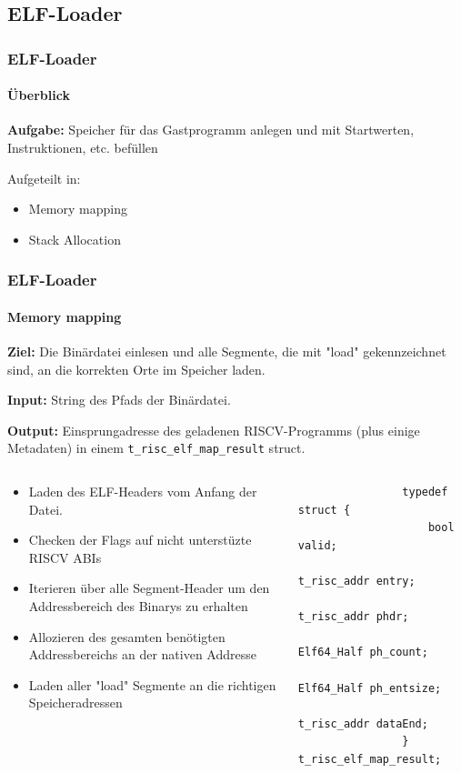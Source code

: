 \documentclass[german]{tum-presentation}
\begin{document}
\subsection{ELF-Loader} %
\begin{frame}
	\frametitle{ELF-Loader}
	\framesubtitle{Überblick}
	\textbf{Aufgabe:} Speicher für das Gastprogramm anlegen und mit Startwerten, Instruktionen, etc. befüllen

	\vspace{0.25cm}
	Aufgeteilt in:
	\begin{itemize}
		\item Memory mapping
		\item Stack Allocation
	\end{itemize}
\end{frame}


\begin{frame}[fragile]
	\frametitle{ELF-Loader}
	\framesubtitle{Memory mapping}
	\textbf{Ziel:} Die Binärdatei einlesen und alle Segmente, die mit "load" gekennzeichnet sind, an die korrekten Orte im Speicher laden.

	\vspace{0.25cm}
	\textbf{Input:} String des Pfads der Binärdatei.

	\textbf{Output:} Einsprungadresse des geladenen RISCV-Programms (plus einige Metadaten) in einem \verb!t_risc_elf_map_result! struct.

	\vspace{0.25cm}

	\begin{columns}[onlytextwidth]

		\begin{column}{0.49\textwidth}
			\begin{itemize}
				\item Laden des ELF-Headers vom Anfang der Datei.
				\item Checken der Flags auf nicht unterstüzte RISCV ABIs
				\item Iterieren über alle Segment-Header um den Addressbereich des Binarys zu erhalten
				\item Allozieren des gesamten benötigten Addressbereichs an der nativen Addresse
				\item Laden aller "load" Segmente an die richtigen Speicheradressen
			\end{itemize}
		\end{column}
		\begin{column}{0.49\textwidth}
			\begin{lstlisting}
				typedef struct {
   					bool valid;
    					t_risc_addr entry;
    					t_risc_addr phdr;
    					Elf64_Half ph_count;
    					Elf64_Half ph_entsize;
    					t_risc_addr dataEnd;
				} t_risc_elf_map_result;
			\end{lstlisting}
		\end{column}
	\end{columns}
\end{frame}
\end{document}

